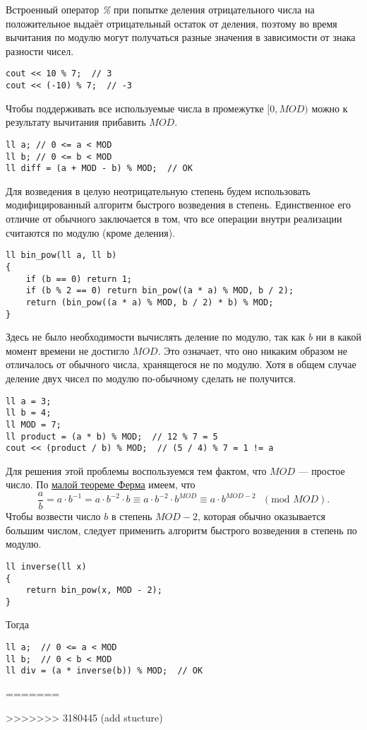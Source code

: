 \documentclass[a4paper,8pt]{article}
\begin{document}
    Встроенный оператор \textit{\%} при попытке деления отрицательного числа на положительное выдаёт отрицательный остаток от деления, поэтому во время вычитания по модулю могут получаться разные значения в зависимости от знака разности чисел.
\begin{lstlisting}
cout << 10 % 7;  // 3
cout << (-10) % 7;  // -3
\end{lstlisting}
    Чтобы поддерживать все используемые числа в промежутке \([0, MOD)\) можно к результату вычитания прибавить $MOD$.
\begin{lstlisting}
ll a; // 0 <= a < MOD
ll b; // 0 <= b < MOD
ll diff = (a + MOD - b) % MOD;  // OK
\end{lstlisting}

    Для возведения в целую неотрицательную степень будем использовать модифицированный алгоритм быстрого возведения в степень. Единственное его отличие от обычного заключается в том, что все операции внутри реализации считаются по модулю (кроме деления).
\begin{lstlisting}
ll bin_pow(ll a, ll b)
{
    if (b == 0) return 1;
    if (b % 2 == 0) return bin_pow((a * a) % MOD, b / 2);
    return (bin_pow((a * a) % MOD, b / 2) * b) % MOD;
}
\end{lstlisting}

    Здесь не было необходимости вычислять деление по модулю, так как $b$ ни в какой момент времени не достигло $MOD$. Это означает, что оно никаким образом не отличалось от обычного числа, хранящегося не по модулю. Хотя в общем случае деление двух чисел по модулю по-обычному сделать не получится.
\begin{lstlisting}
ll a = 3;
ll b = 4;
ll MOD = 7;
ll product = (a * b) % MOD;  // 12 % 7 = 5
cout << (product / b) % MOD;  // (5 / 4) % 7 = 1 != a
\end{lstlisting}
    Для решения этой проблемы воспользуемся тем фактом, что $MOD$ --- простое число. По \href{https://ru.wikipedia.org/wiki/%D0%9C%D0%B0%D0%BB%D0%B0%D1%8F_%D1%82%D0%B5%D0%BE%D1%80%D0%B5%D0%BC%D0%B0_%D0%A4%D0%B5%D1%80%D0%BC%D0%B0#%D0%90%D0%BB%D1%8C%D1%82%D0%B5%D1%80%D0%BD%D0%B0%D1%82%D0%B8%D0%B2%D0%BD%D0%B0%D1%8F_%D1%84%D0%BE%D1%80%D0%BC%D1%83%D0%BB%D0%B8%D1%80%D0%BE%D0%B2%D0%BA%D0%B0}{малой теореме Ферма} имеем, что
    \[\frac{a}{b} = a \cdot b^{-1} = a \cdot b^{-2} \cdot b \equiv a \cdot b^{-2} \cdot b^{MOD} \equiv a \cdot b^{MOD - 2} \text{ } (\text{mod } MOD).\]
    Чтобы возвести число $b$ в степень $MOD - 2$, которая обычно оказывается большим числом, следует применить алгоритм быстрого возведения в степень по модулю. 
\newpage
\begin{lstlisting}
ll inverse(ll x)
{
    return bin_pow(x, MOD - 2);
}
\end{lstlisting}
    Тогда
\begin{lstlisting}
ll a;  // 0 <= a < MOD
ll b;  // 0 < b < MOD
ll div = (a * inverse(b)) % MOD;  // OK
\end{lstlisting}
=======
    
    
>>>>>>> 3180445 (add stucture)
\end{document}
